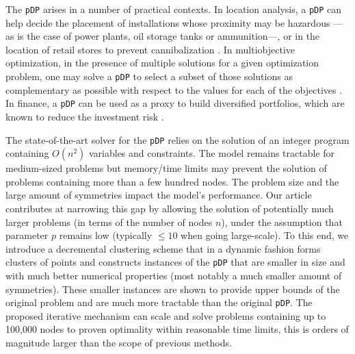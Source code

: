 \documentclass[a4paper,10pt]{article}
\newcommand{\pDP}{\texttt{pDP}}
\begin{document}
The \pDP{} arises in a number of practical contexts. In location analysis, a \pDP{} can help decide the placement of installations whose proximity may be hazardous ---as is the case of power plants, oil storage tanks or ammunition---, or in the location of retail stores to prevent cannibalization \citep{Kuby1987Programming}. In multiobjective optimization, in the presence of multiple solutions for a given optimization problem, one may solve a \pDP{} to select a subset of those solutions as complementary as possible with respect to the values for each of the objectives \citep{Saboonchi2014MaxMinMin}. In finance, a \pDP{} can be used as a proxy to build diversified portfolios, which are known to reduce the investment risk \citep{Statman1987how}.
	

The state-of-the-art solver for the \pDP{} \citep{Sayah2017new} relies on the solution of an integer program containing $O(n^2)$ variables and constraints. The model remains tractable for medium-sized problems but memory/time limits may prevent the solution of problems containing more than a few hundred nodes. The problem size and the large amount of symmetries impact the model's performance. Our article contributes at narrowing this gap by allowing the solution of potentially much larger problems (in terms of the number of nodes $n$), under the assumption that parameter $p$ remains low (typically $\leq 10$ when going large-scale). To this end, we introduce a decremental clustering scheme that in a dynamic fashion forms clusters of points and constructs instances of the \pDP{} that are smaller in size and with much better numerical properties (most notably a much smaller amount of symmetries). These smaller instances are shown to provide upper bounds of the original problem and are much more tractable than the original \pDP{}. The proposed iterative mechanism can scale and solve problems containing up to 100,000 nodes to proven optimality within reasonable time limits, this is orders of magnitude larger than the scope of previous methods.
\end{document}
